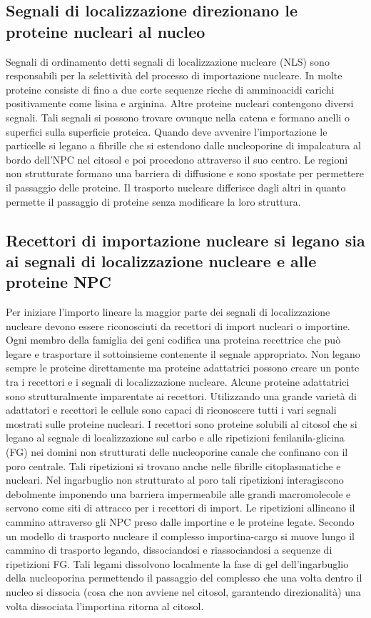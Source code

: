 \subsection{Segnali di localizzazione direzionano le proteine nucleari al nucleo}
Segnali di ordinamento detti segnali di localizzazione nucleare (NLS) sono responsabili per la selettivit\`a del processo di importazione nucleare. In molte proteine consiste di fino a
due corte sequenze ricche di amminoacidi carichi positivamente come lisina e arginina. Altre proteine nucleari contengono diversi segnali. Tali segnali si possono trovare ovunque nella
catena e formano anelli o superfici sulla superficie proteica. Quando deve avvenire l'importazione le particelle si legano a fibrille che si estendono dalle nucleoporine di impalcatura
al bordo dell'NPC nel citosol e poi procedono attraverso il suo centro. Le regioni non strutturate formano una barriera di diffusione e sono spostate per permettere il passaggio delle
proteine. Il trasporto nucleare differisce dagli altri in quanto permette il passaggio di proteine senza modificare la loro struttura.
\subsection{Recettori di importazione nucleare si legano sia ai segnali di localizzazione nucleare e alle proteine NPC}
Per iniziare l'importo lineare la maggior parte dei segnali di localizzazione nucleare devono essere riconosciuti da recettori di import nucleari o importine. Ogni membro della famiglia
dei geni codifica una proteina recettrice che pu\`o legare e trasportare il sottoinsieme contenente il segnale appropriato. Non legano sempre le proteine direttamente ma proteine 
adattatrici possono creare un ponte tra i recettori e i segnali di localizzazione nucleare. Alcune proteine adattatrici sono strutturalmente imparentate ai recettori. Utilizzando una
grande variet\`a di adattatori e recettori le cellule sono capaci di riconoscere tutti i vari segnali mostrati sulle proteine nucleari. I recettori sono proteine solubili al citosol che
si legano al segnale di localizzazione sul carbo e alle ripetizioni fenilanila-glicina (FG) nei domini non strutturati delle nucleoporine canale che confinano con il poro centrale. Tali
ripetizioni si trovano anche nelle fibrille citoplasmatiche e nucleari. Nel ingarbuglio non strutturato al poro tali ripetizioni interagiscono debolmente imponendo una barriera 
impermeabile alle grandi macromolecole e servono come siti di attracco per i recettori di import. Le ripetizioni allineano il cammino attraverso gli NPC preso dalle importine e le 
proteine legate. Secondo un modello di trasporto nucleare il complesso importina-cargo si muove lungo il cammino di trasporto legando, dissociandosi e riassociandosi a sequenze di
ripetizioni FG. Tali legami dissolvono localmente la fase di gel dell'ingarbuglio della nucleoporina  permettendo il passaggio del complesso che una volta dentro il nucleo si dissocia
(cosa che non avviene nel citosol, garantendo direzionalit\`a) una volta dissociata l'importina ritorna al citosol.
